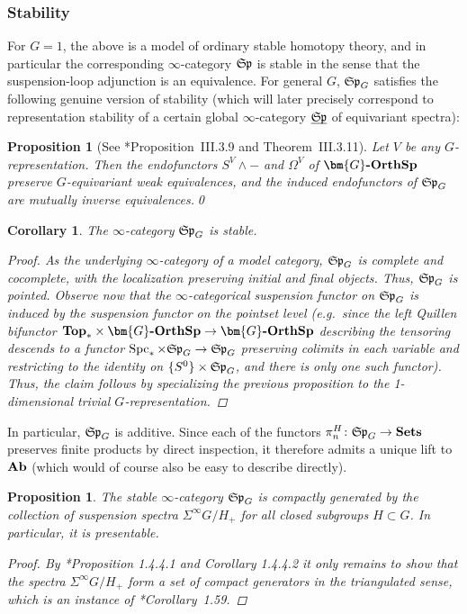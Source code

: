 \documentclass[reqno]{memo-l}
\theoremstyle{mythm}
\newtheorem{cor}[thm]{Corollary}
\newtheorem{prop}[thm]{Proposition}
\theoremstyle{definition}
\numberwithin{equation}{section}
\DeclareMathOperator{\Spc}{Spc}
\newcommand{\cat}[1]{\textbf{\textup{#1}}}
\newcommand{\ulhelper}[2]{\underline{\setbox0=\hbox{$#1#2$}\dp0=0.4pt \box0\relax}}
\newcommand{\ul}[1]{{\mathpalette\ulhelper{#1}}\hbox{\rule[-2pt]{0pt}{0pt}}}
\let\smashp=\wedge
\newcommand{\mySp}{{\mathfrak S\kern-.5pt\mathfrak p}}
\newcommand{\Gosp}[1]{\cat{$\bm{#1}$-OrthSp}}
\begin{document}
\subsubsection{Stability} For $G=1$, the above is a model of ordinary stable homotopy theory, and in particular the corresponding $\infty$-category $\mySp$ is stable in the sense that the suspension-loop adjunction is an equivalence. For general $G$, $\mySp_G$ satisfies the following genuine version of stability (which will later precisely correspond to representation stability of a certain global $\infty$-category $\ul\mySp$ of equivariant spectra):

\begin{prop}[See \cite{mandell-may}*{Proposition~III.3.9 and Theorem~III.3.11}]\label{prop:rep-spheres-invertible-equiv-model}
    Let $V$ be any $G$-representation. Then the endofunctors $S^V\smashp-$ and $\Omega^V$ of $\Gosp{G}$ preserve $G$-equivariant weak equivalences, and the induced endofunctors of $\mySp_G$ are mutually inverse equivalences.\qed
\end{prop}

\begin{cor}
    The $\infty$-category $\mySp_G$ is stable.
    \begin{proof}
        As the underlying $\infty$-category of a model category, $\mySp_G$ is complete and cocomplete, with the localization preserving initial and final objects. Thus, $\mySp_G$ is pointed. Observe now that the $\infty$-categorical suspension functor on $\mySp_G$ is induced by the suspension functor on the pointset level (e.g.~since the left Quillen bifunctor $\cat{Top}_*\times\Gosp{G}\to\Gosp{G}$ describing the tensoring descends to a functor $\Spc_*\times\mySp_G\to\mySp_G$ preserving colimits in each variable and restricting to the identity on $\{S^0\}\times\mySp_G$, and there is only one such functor). Thus, the claim follows by specializing the previous proposition to the 1-dimensional trivial $G$-representation.
    \end{proof}
\end{cor}

In particular, $\mySp_G$ is additive. Since each of the functors $\pi_n^H\colon\mySp_G\to\cat{Sets}$ preserves finite products by direct inspection, it therefore admits a unique lift to $\cat{Ab}$ (which would of course also be easy to describe directly).

\begin{prop}\label{prop:equiv-sp-compact-gen}
    The stable $\infty$-category $\mySp_G$ is compactly generated by the collection of suspension spectra $\Sigma^\infty G/H_+$ for all closed subgroups $H\subset G$. In particular, it is presentable.
    \begin{proof}
        By \cite{HA}*{Proposition 1.4.4.1 and Corollary 1.4.4.2} it only remains to show that the spectra $\Sigma^\infty G/H_+$ form a set of compact generators in the triangulated sense, which is an instance of \cite{DHLPS2019Proper}*{Corollary~1.59}.
    \end{proof}
\end{prop}
\end{document}
